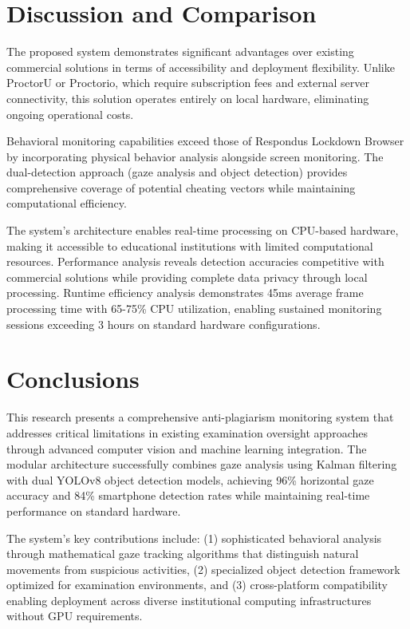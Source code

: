 \documentclass[conference]{IEEEtran}
\begin{document}
\section{Discussion and Comparison}

The proposed system demonstrates significant advantages over existing commercial solutions 
in terms of accessibility and deployment flexibility. Unlike ProctorU or Proctorio, which 
require subscription fees and external server connectivity\cite{proctoru}\cite{proctorio}, 
this solution operates entirely on local hardware, eliminating ongoing operational costs.

Behavioral monitoring capabilities exceed those of Respondus Lockdown Browser by incorporating 
physical behavior analysis alongside screen monitoring\cite{respondus}. The dual-detection 
approach (gaze analysis and object detection) provides comprehensive coverage of potential 
cheating vectors while maintaining computational efficiency.

The system's architecture enables real-time processing on CPU-based hardware, 
making it accessible to educational institutions with limited computational resources. 
Performance analysis reveals detection accuracies competitive with commercial solutions 
while providing complete data privacy through local processing. Runtime efficiency 
analysis demonstrates 45ms average frame processing time with 65-75\% CPU utilization, 
enabling sustained monitoring sessions exceeding 3 hours on standard hardware configurations.

\section{Conclusions}

This research presents a comprehensive anti-plagiarism monitoring system that addresses critical limitations in existing examination oversight approaches through advanced computer vision and machine learning integration. The modular architecture successfully combines gaze analysis using Kalman filtering with dual YOLOv8 object detection models, achieving 96\% horizontal gaze accuracy and 84\% smartphone detection rates while maintaining real-time performance on standard hardware.

The system's key contributions include: (1) sophisticated behavioral analysis through mathematical gaze tracking algorithms that distinguish natural movements from suspicious activities, (2) specialized object detection framework optimized for examination environments, and (3) cross-platform compatibility enabling deployment across diverse institutional computing infrastructures without GPU requirements.
\end{document}
